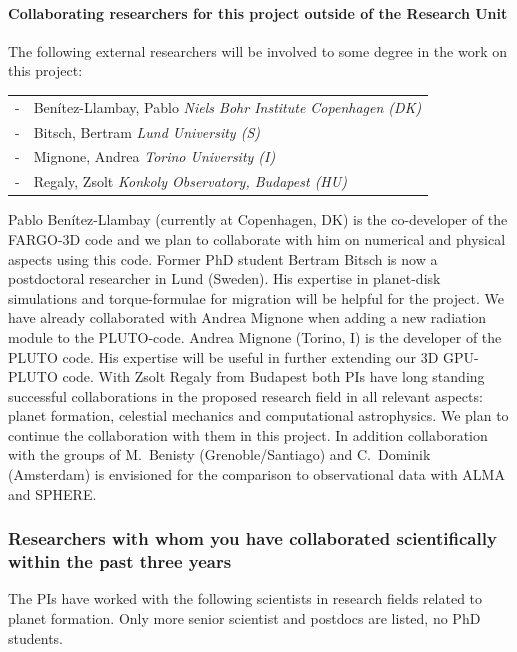 \documentclass[10pt,fleqn,twoside]{article}
\begin{document}

\paragraph{Collaborating researchers for this project outside of
  the Research Unit}
The following external researchers will be involved to some degree in the work on this project:
\begin{center}
\begin{tabular}{cp{}}
 - & Ben\'itez-Llambay, Pablo \hfill {\em \small Niels Bohr Institute Copenhagen (DK)} \\[0.1cm]
 - & Bitsch, Bertram  \hfill {\em \small Lund University (S)} \\[0.1cm]
 - & Mignone, Andrea  \hfill {\em \small Torino University (I)} \\[0.1cm]
 - & Regaly, Zsolt \hfill {\em \small Konkoly Observatory, Budapest (HU)} \\[0.1cm]
\end{tabular}
\end{center}
Pablo Ben\'itez-Llambay (currently at Copenhagen, DK) 
is the co-developer of the FARGO-3D code and we plan to collaborate with him
on numerical and physical aspects using this code. 
Former PhD student Bertram Bitsch is now a postdoctoral researcher in Lund (Sweden). His expertise in planet-disk
simulations and torque-formulae for migration will be helpful for the project.
We have already collaborated with Andrea Mignone when adding a new radiation module to the PLUTO-code.
Andrea Mignone (Torino, I) is the developer of the PLUTO code.
His expertise will be useful in further extending our 3D GPU-PLUTO code.
With Zsolt Regaly from Budapest both PIs have long standing successful collaborations in the
proposed research field in all relevant aspects: planet formation, celestial mechanics and computational astrophysics.
We plan to continue the collaboration with them in this project.
In addition collaboration with the groups of M.~Benisty
(Grenoble/Santiago) and C.~Dominik (Amsterdam) is envisioned for the
comparison to observational data with ALMA and SPHERE.

\subsubsection{Researchers with whom you have collaborated scientifically within the past three years}
The PIs have worked with the following scientists in research fields related to planet formation.
Only more senior scientist and postdocs are listed, no PhD students.
\end{document}
